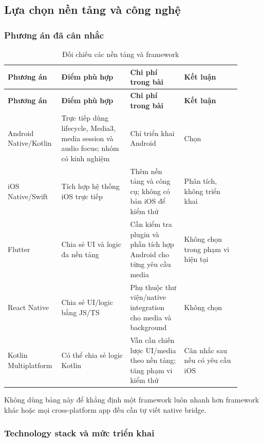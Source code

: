 \subsection{Lựa chọn nền tảng và công nghệ}
\label{sec:platform-selection}

\subsubsection{Phương án đã cân nhắc}
\label{sec:platform-comparison}

\begingroup
\small
\renewcommand{\arraystretch}{1.2}
\setlength{\tabcolsep}{3pt}
\begin{longtable}{>{\RaggedRight\arraybackslash}p{0.17\linewidth}>{\RaggedRight\arraybackslash}p{0.28\linewidth}>{\RaggedRight\arraybackslash}p{0.22\linewidth}>{\RaggedRight\arraybackslash}p{0.23\linewidth}}
\caption{Đối chiếu các nền tảng và framework}
\label{tab:platform-comparison}\\
\toprule
\textbf{Phương án} & \textbf{Điểm phù hợp} & \textbf{Chi phí trong bài} & \textbf{Kết luận} \\
\midrule
\endfirsthead
\toprule
\textbf{Phương án} & \textbf{Điểm phù hợp} & \textbf{Chi phí trong bài} & \textbf{Kết luận} \\
\midrule
\endhead
\bottomrule
\endfoot
Android Native/Kotlin & Trực tiếp dùng lifecycle, Media3, media session và audio focus; nhóm có kinh nghiệm & Chỉ triển khai Android & Chọn \\
iOS Native/Swift & Tích hợp hệ thống iOS trực tiếp & Thêm nền tảng và công cụ; không có bản iOS để kiểm thử & Phân tích, không triển khai \\
Flutter & Chia sẻ UI và logic đa nền tảng & Cần kiểm tra plugin và phần tích hợp Android cho từng yêu cầu media & Không chọn trong phạm vi hiện tại \\
React Native & Chia sẻ UI/logic bằng JS/TS & Phụ thuộc thư viện/native integration cho media và background & Không chọn \\
Kotlin Multiplatform & Có thể chia sẻ logic Kotlin & Vẫn cần chiến lược UI/media theo nền tảng; tăng phạm vi kiểm thử & Cân nhắc sau nếu có yêu cầu iOS \\
\end{longtable}
\endgroup

Không dùng bảng này để khẳng định một framework luôn nhanh hơn framework khác hoặc mọi cross-platform app đều cần tự viết native bridge.

\subsubsection{Technology stack và mức triển khai}
\label{sec:tech-stack}

